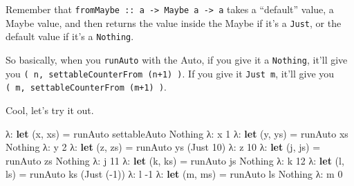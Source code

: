 \documentclass[]{article}
\newenvironment{Shaded}{}{}
\newcommand{\KeywordTok}[1]{\textcolor[rgb]{0.00,0.44,0.13}{\textbf{{#1}}}}
\newcommand{\DataTypeTok}[1]{\textcolor[rgb]{0.56,0.13,0.00}{{#1}}}
\newcommand{\DecValTok}[1]{\textcolor[rgb]{0.25,0.63,0.44}{{#1}}}
\newcommand{\OtherTok}[1]{\textcolor[rgb]{0.00,0.44,0.13}{{#1}}}
\newcommand{\FunctionTok}[1]{\textcolor[rgb]{0.02,0.16,0.49}{{#1}}}
\newcommand{\NormalTok}[1]{{#1}}
\begin{document}
\begin{Shaded}
\end{Shaded}

Remember that \texttt{fromMaybe\ ::\ a\ -\textgreater{}\ Maybe\ a\ -\textgreater{}\ a} takes a
``default'' value, a Maybe value, and then returns the value inside the Maybe if it's a
\texttt{Just}, or the default value if it's a \texttt{Nothing}.

So basically, when you \texttt{runAuto} with the Auto, if you give it a \texttt{Nothing}, it'll give
you \texttt{(\ n,\ settableCounterFrom\ (n+1)\ )}. If you give it \texttt{Just\ m}, it'll give you
\texttt{(\ m,\ settableCounterFrom\ (m+1)\ )}.

Cool, let's try it out.

\begin{Shaded}
\begin{Highlighting}[]
\NormalTok{λ}\FunctionTok{:} \KeywordTok{let} \NormalTok{(x, xs) }\FunctionTok{=} \NormalTok{runAuto settableAuto }\DataTypeTok{Nothing}
\NormalTok{λ}\FunctionTok{:} \NormalTok{x}
\DecValTok{1}
\NormalTok{λ}\FunctionTok{:} \KeywordTok{let} \NormalTok{(y, ys) }\FunctionTok{=} \NormalTok{runAuto xs }\DataTypeTok{Nothing}
\NormalTok{λ}\FunctionTok{:} \NormalTok{y}
\DecValTok{2}
\NormalTok{λ}\FunctionTok{:} \KeywordTok{let} \NormalTok{(z, zs) }\FunctionTok{=} \NormalTok{runAuto ys (}\DataTypeTok{Just} \DecValTok{10}\NormalTok{)}
\NormalTok{λ}\FunctionTok{:} \NormalTok{z}
\DecValTok{10}
\NormalTok{λ}\FunctionTok{:} \KeywordTok{let} \NormalTok{(j, js) }\FunctionTok{=} \NormalTok{runAuto zs }\DataTypeTok{Nothing}
\NormalTok{λ}\FunctionTok{:} \NormalTok{j}
\DecValTok{11}
\NormalTok{λ}\FunctionTok{:} \KeywordTok{let} \NormalTok{(k, ks) }\FunctionTok{=} \NormalTok{runAuto js }\DataTypeTok{Nothing}
\NormalTok{λ}\FunctionTok{:} \NormalTok{k}
\DecValTok{12}
\NormalTok{λ}\FunctionTok{:} \KeywordTok{let} \NormalTok{(l, ls) }\FunctionTok{=} \NormalTok{runAuto ks (}\DataTypeTok{Just} \NormalTok{(}\FunctionTok{-}\DecValTok{1}\NormalTok{))}
\NormalTok{λ}\FunctionTok{:} \NormalTok{l}
\FunctionTok{-}\DecValTok{1}
\NormalTok{λ}\FunctionTok{:} \KeywordTok{let} \NormalTok{(m, ms) }\FunctionTok{=} \NormalTok{runAuto ls }\DataTypeTok{Nothing}
\NormalTok{λ}\FunctionTok{:} \NormalTok{m}
\DecValTok{0}
\end{Highlighting}
\end{Shaded}
\end{document}
